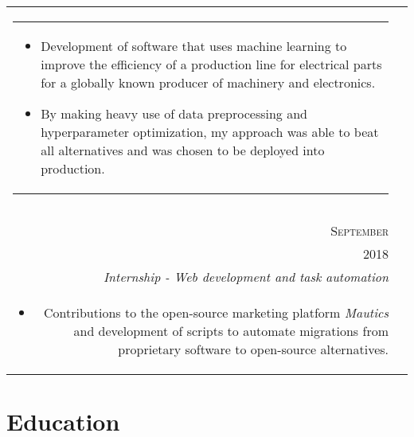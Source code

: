 \documentclass[a4paper,10pt]{article}
\begin{document}
\begin{tabularx}{\textwidth}{ r | X }
\begin{tabular}{p{}}
\begin{itemize}[leftmargin=*]
        \item Development of software that uses machine learning to improve the
            efficiency of a production line for electrical parts for a globally
            known producer of machinery and electronics.

        \item By making heavy use of data preprocessing and hyperparameter
            optimization, my approach was able to beat all alternatives and was
            chosen to be deployed into production.

    \end{itemize}
    \end{tabular}
    \vspace{-6mm} \\
  \multicolumn{2}{c}{}\\

  \begin{tabular}{r}
      \textsc{August \&} \\
      \textsc{September} \\
      \textsc{2018}
  \end{tabular} &

  \begin{tabular}{p{}}
    \textsc{Padberg \& Partners} \\
    \emph{Internship - Web development and task automation}\\
    \vspace{-2mm}
    \begin{itemize}[leftmargin=*]

        \item Contributions to the open-source marketing platform
            \textit{Mautics} and development of scripts to automate migrations
            from proprietary software to open-source alternatives.

    \end{itemize}
  \end{tabular}
  \vspace{-6mm} \\

\end{tabularx}

\section{Education}
\end{document}
